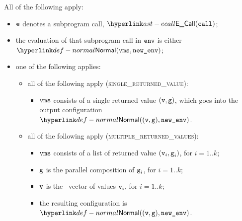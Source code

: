 All of the following apply:
\begin{itemize}
  \item $\ve$ denotes a subprogram call, $\ECall(\vcall)$;
  \item the evaluation of that subprogram call in $\env$ is either
  $\Normal(\vms, \newenv)$\ProseOrAbnormal;
  \item one of the following applies:
  \begin{itemize}
    \item all of the following apply (\textsc{single\_returned\_value}):
    \begin{itemize}
      \item $\vms$ consists of a single returned value $(\vv,\vg)$,
      which goes into the output configuration $\Normal((\vv, \vg), \newenv)$.
    \end{itemize}

    \item all of the following apply (\textsc{multiple\_returned\_values}):
    \begin{itemize}
      \item $\vms$ consists of a list of returned value $(\vv_i,\vg_i)$, for $i=1..k$;
      \item $\vg$ is the parallel composition of $\vg_i$, for $i=1..k$;
      \item $\vv$ is the \nativevalue\  vector of values $\vv_i$, for $i=1..k$;
      \item the resulting configuration is $\Normal((\vv, \vg), \newenv)$.
    \end{itemize}
  \end{itemize}
\end{itemize}

\FormallyParagraph
\begin{mathpar}
\end{mathpar}

\begin{mathpar}
\end{mathpar}

